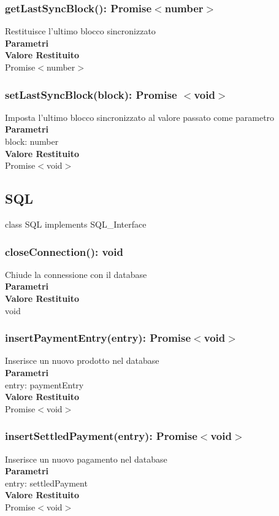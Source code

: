 \documentclass[a4paper, 12pt]{article}
\begin{document}
\subsubsection{getLastSyncBlock(): Promise$<$number$>$}
Restituisce l'ultimo blocco sincronizzato\\
\textbf{Parametri}\\
\textbf{Valore Restituito}\\
Promise$<$number$>$
\subsubsection{setLastSyncBlock(block): Promise $<$void$>$}
Imposta l'ultimo blocco sincronizzato al valore passato come parametro\\
\textbf{Parametri}\\
block: number\\
\textbf{Valore Restituito}\\
Promise$<$void$>$

\subsection{SQL}
class SQL implements SQL\_Interface
\subsubsection{closeConnection(): void}
Chiude la connessione con il database\\
\textbf{Parametri}\\
\textbf{Valore Restituito}\\
void
\subsubsection{insertPaymentEntry(entry): Promise$<$void$>$}
Inserisce un nuovo prodotto nel database\\
\textbf{Parametri}\\
entry: paymentEntry\\
\textbf{Valore Restituito}\\
Promise$<$void$>$
\subsubsection{insertSettledPayment(entry): Promise$<$void$>$}
Inserisce un nuovo pagamento nel database\\
\textbf{Parametri}\\
entry: settledPayment\\
\textbf{Valore Restituito}\\
Promise$<$void$>$
\end{document}
